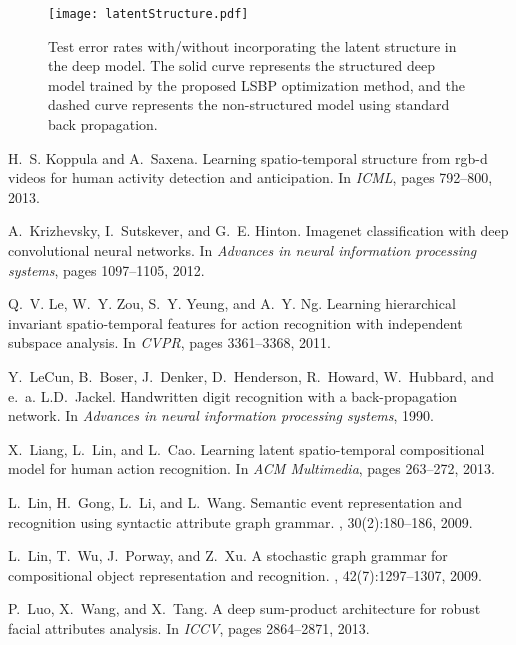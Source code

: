 \documentclass{sig-alternate}
\begin{document}
\begin{thebibliography}{40}
\begin{figure}[!htb]
\centering
\texttt{[image: latentStructure.pdf]}
\caption{Test error rates with/without incorporating the latent structure in the deep model. The solid curve represents the structured deep model trained by the proposed LSBP optimization method, and the dashed curve represents the non-structured model using standard back propagation.}\label{fig:latentStruct}
\end{figure}

H.~S. Koppula and A.~Saxena.
\newblock Learning spatio-temporal structure from rgb-d videos for human
  activity detection and anticipation.
\newblock In {\em ICML}, pages 792--800, 2013.

A.~Krizhevsky, I.~Sutskever, and G.~E. Hinton.
\newblock Imagenet classification with deep convolutional neural networks.
\newblock In {\em Advances in neural information processing systems}, pages
  1097--1105, 2012.

Q.~V. Le, W.~Y. Zou, S.~Y. Yeung, and A.~Y. Ng.
\newblock Learning hierarchical invariant spatio-temporal features for action
  recognition with independent subspace analysis.
\newblock In {\em CVPR}, pages 3361--3368, 2011.

Y.~LeCun, B.~Boser, J.~Denker, D.~Henderson, R.~Howard, W.~Hubbard, and e.~a.
  L.D.~Jackel.
\newblock Handwritten digit recognition with a back-propagation network.
\newblock In {\em Advances in neural information processing systems}, 1990.

X.~Liang, L.~Lin, and L.~Cao.
\newblock Learning latent spatio-temporal compositional model for human action
  recognition.
\newblock In {\em ACM Multimedia}, pages 263--272, 2013.

L.~Lin, H.~Gong, L.~Li, and L.~Wang.
\newblock Semantic event representation and recognition using syntactic
  attribute graph grammar.
, 30(2):180--186, 2009.

L.~Lin, T.~Wu, J.~Porway, and Z.~Xu.
\newblock A stochastic graph grammar for compositional object representation
  and recognition.
, 42(7):1297--1307, 2009.

P.~Luo, X.~Wang, and X.~Tang.
\newblock A deep sum-product architecture for robust facial attributes
  analysis.
\newblock In {\em ICCV}, pages 2864--2871, 2013.


\end{thebibliography}
\end{document}
